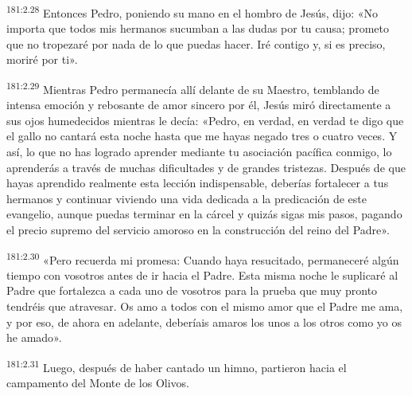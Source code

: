 \par 
\textsuperscript{181:2.28} Entonces Pedro, poniendo su mano en el hombro de Jesús, dijo: «No importa que todos mis hermanos sucumban a las dudas por tu causa; prometo que no tropezaré por nada de lo que puedas hacer. Iré contigo y, si es preciso, moriré por ti».

\par 
\textsuperscript{181:2.29} Mientras Pedro permanecía allí delante de su Maestro, temblando de intensa emoción y rebosante de amor sincero por él, Jesús miró directamente a sus ojos humedecidos mientras le decía: «Pedro, en verdad, en verdad te digo que el gallo no cantará esta noche hasta que me hayas negado tres o cuatro veces. Y así, lo que no has logrado aprender mediante tu asociación pacífica conmigo, lo aprenderás a través de muchas dificultades y de grandes tristezas. Después de que hayas aprendido realmente esta lección indispensable, deberías fortalecer a tus hermanos y continuar viviendo una vida dedicada a la predicación de este evangelio, aunque puedas terminar en la cárcel y quizás sigas mis pasos, pagando el precio supremo del servicio amoroso en la construcción del reino del Padre».

\par 
\textsuperscript{181:2.30} «Pero recuerda mi promesa: Cuando haya resucitado, permaneceré algún tiempo con vosotros antes de ir hacia el Padre. Esta misma noche le suplicaré al Padre que fortalezca a cada uno de vosotros para la prueba que muy pronto tendréis que atravesar. Os amo a todos con el mismo amor que el Padre me ama, y por eso, de ahora en adelante, deberíais amaros los unos a los otros como yo os he amado».

\par 
\textsuperscript{181:2.31} Luego, después de haber cantado un himno, partieron hacia el campamento del Monte de los Olivos.